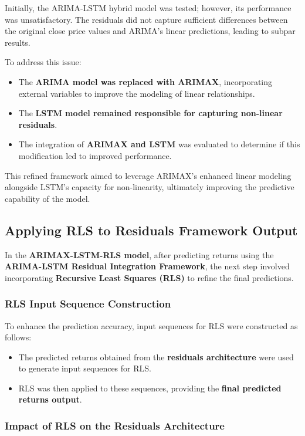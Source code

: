 Initially, the ARIMA-LSTM hybrid model was tested; however, its performance was unsatisfactory. The residuals did not capture sufficient differences between the original close price values and ARIMA’s linear predictions, leading to subpar results. 

To address this issue:
\begin{itemize}
    \item The \textbf{ARIMA model was replaced with ARIMAX}, incorporating external variables to improve the modeling of linear relationships.
    \item The \textbf{LSTM model remained responsible for capturing non-linear residuals}.
    \item The integration of \textbf{ARIMAX and LSTM} was evaluated to determine if this modification led to improved performance.
\end{itemize}

This refined framework aimed to leverage ARIMAX's enhanced linear modeling alongside LSTM's capacity for non-linearity, ultimately improving the predictive capability of the model.

\subsection{Applying RLS to Residuals Framework Output}

In the \textbf{ARIMAX-LSTM-RLS model}, after predicting returns using the \textbf{ARIMA-LSTM Residual Integration Framework}, the next step involved incorporating \textbf{Recursive Least Squares (RLS)} to refine the final predictions.

\subsubsection{RLS Input Sequence Construction}

To enhance the prediction accuracy, input sequences for RLS were constructed as follows:
\begin{itemize}
    \item The predicted returns obtained from the \textbf{residuals architecture} were used to generate input sequences for RLS.
    \item RLS was then applied to these sequences, providing the \textbf{final predicted returns output}.
\end{itemize}

\subsubsection{Impact of RLS on the Residuals Architecture}

